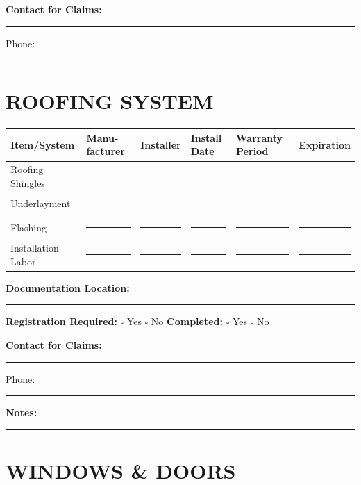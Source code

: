 \documentclass[11pt,letterpaper]{article}
\begin{document}
\textbf{Contact for Claims:} \rule{7cm}{0.4pt} Phone: \rule{3cm}{0.4pt}

\vspace{12pt}

\section*{ROOFING SYSTEM}

\begin{tabular}{|p{1.5in}|p{1in}|p{1in}|p{0.8in}|p{0.8in}|p{1in}|}
\hline
\textbf{Item/System} & \textbf{Manu-facturer} & \textbf{Installer} & \textbf{Install Date} & \textbf{Warranty Period} & \textbf{Expiration} \\
\hline
Roofing Shingles & \rule{0.8in}{0.4pt} & \rule{0.8in}{0.4pt} & \rule{0.6in}{0.4pt} & \rule{0.6in}{0.4pt} & \rule{0.8in}{0.4pt} \\
\hline
Underlayment & \rule{0.8in}{0.4pt} & \rule{0.8in}{0.4pt} & \rule{0.6in}{0.4pt} & \rule{0.6in}{0.4pt} & \rule{0.8in}{0.4pt} \\
\hline
Flashing & \rule{0.8in}{0.4pt} & \rule{0.8in}{0.4pt} & \rule{0.6in}{0.4pt} & \rule{0.6in}{0.4pt} & \rule{0.8in}{0.4pt} \\
\hline
Installation Labor & \rule{0.8in}{0.4pt} & \rule{0.8in}{0.4pt} & \rule{0.6in}{0.4pt} & \rule{0.6in}{0.4pt} & \rule{0.8in}{0.4pt} \\
\hline
\end{tabular}

\vspace{6pt}

\textbf{Documentation Location:} \rule{8cm}{0.4pt}

\textbf{Registration Required:} $\square$ Yes $\square$ No \hspace{0.3in} \textbf{Completed:} $\square$ Yes $\square$ No

\textbf{Contact for Claims:} \rule{7cm}{0.4pt} Phone: \rule{3cm}{0.4pt}

\textbf{Notes:} \rule{12cm}{0.4pt}

\vspace{12pt}

\section*{WINDOWS \& DOORS}
\end{document}
